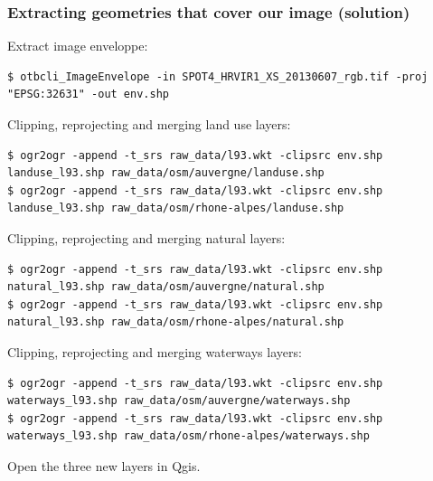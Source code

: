 \documentclass[8pt]{beamer}
\begin{document}
\begin{frame}[fragile]
\frametitle{Extracting geometries that cover our image (solution)}
Extract image enveloppe:
\begin{scriptsize}
\begin{verbatim}
$ otbcli_ImageEnvelope -in SPOT4_HRVIR1_XS_20130607_rgb.tif -proj "EPSG:32631" -out env.shp
\end{verbatim}
\end{scriptsize}
Clipping, reprojecting and merging land use layers:
\begin{scriptsize}
\begin{verbatim}
$ ogr2ogr -append -t_srs raw_data/l93.wkt -clipsrc env.shp landuse_l93.shp raw_data/osm/auvergne/landuse.shp
$ ogr2ogr -append -t_srs raw_data/l93.wkt -clipsrc env.shp landuse_l93.shp raw_data/osm/rhone-alpes/landuse.shp
\end{verbatim}
\end{scriptsize}
Clipping, reprojecting and merging natural layers:
\begin{scriptsize}
\begin{verbatim}
$ ogr2ogr -append -t_srs raw_data/l93.wkt -clipsrc env.shp natural_l93.shp raw_data/osm/auvergne/natural.shp
$ ogr2ogr -append -t_srs raw_data/l93.wkt -clipsrc env.shp natural_l93.shp raw_data/osm/rhone-alpes/natural.shp
\end{verbatim}
\end{scriptsize}
Clipping, reprojecting and merging waterways layers:
\begin{scriptsize}
\begin{verbatim}
$ ogr2ogr -append -t_srs raw_data/l93.wkt -clipsrc env.shp waterways_l93.shp raw_data/osm/auvergne/waterways.shp
$ ogr2ogr -append -t_srs raw_data/l93.wkt -clipsrc env.shp waterways_l93.shp raw_data/osm/rhone-alpes/waterways.shp
\end{verbatim}
\end{scriptsize}

Open the three new layers in Qgis.
\end{frame}
\end{document}
